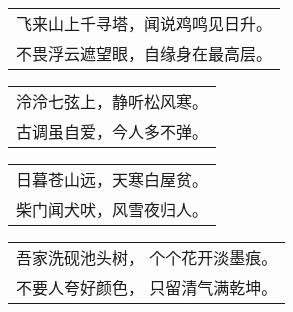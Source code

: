 \nopagebreak%
\nopagebreak%
\noindent\begin{minipage}{\linewidth}
  \vskip-3pt\begin{table}[H]
    \centering
    \begin{tabular}{@{}l@{}}
飞来山上千寻塔，闻说鸡鸣见日升。\\
不畏浮云遮望眼，自缘身在最高层。
    \end{tabular}
  \end{table}
\end{minipage}
\vspace{1cm}


\nopagebreak%
\nopagebreak%
\noindent\begin{minipage}{\linewidth}
  \vskip-3pt\begin{table}[H]
    \centering
    \begin{tabular}{@{}l@{}}
泠泠七弦上，静听松风寒。\\
古调虽自爱，今人多不弹。
    \end{tabular}
  \end{table}
\end{minipage}
\vspace{1cm}


\nopagebreak%
\nopagebreak%
\noindent\begin{minipage}{\linewidth}
  \vskip-3pt\begin{table}[H]
    \centering
    \begin{tabular}{@{}l@{}}
日暮苍山远，天寒白屋贫。\\
柴门闻犬吠，风雪夜归人。
    \end{tabular}
  \end{table}
\end{minipage}
\vspace{1cm}


\nopagebreak%
\nopagebreak%
\noindent\begin{minipage}{\linewidth}
  \vskip-3pt\begin{table}[H]
    \centering
    \begin{tabular}{@{}l@{}}
吾家洗砚池头树， 个个花开淡墨痕。\\
不要人夸好颜色， 只留清气满乾坤。
    \end{tabular}
  \end{table}
\end{minipage}
\vspace{1cm}



